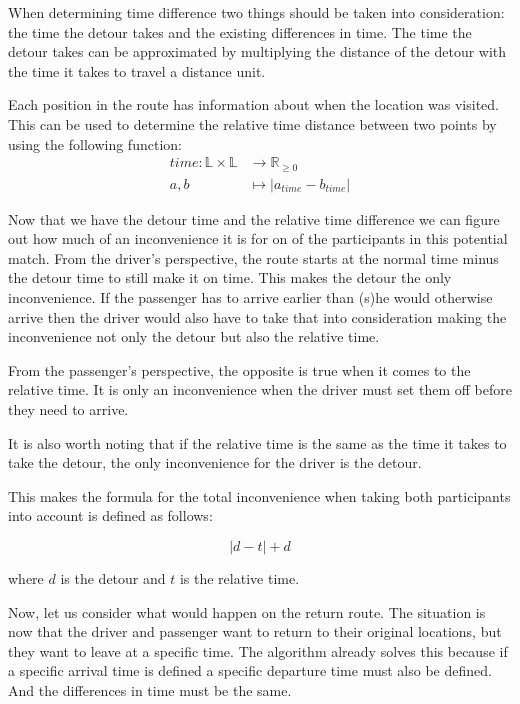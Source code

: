 When determining time difference two things should be taken into consideration: the time the detour takes and the existing differences in time.
The time the detour takes can be approximated by multiplying the distance of the detour with the time it takes to travel a distance unit.

Each position in the route has information about when the location was visited.
This can be used to determine the relative time distance between two points by using the following function:
\begin{align*}
	time : \mathbb{L}\times\mathbb{L} &\rightarrow \mathbb{R}_{\geq 0}\\
	a, b &\mapsto | a_{time} - b_{time} |
\end{align*}

Now that we have the detour time and the relative time difference we can figure out how much of an inconvenience it is for on of the participants in this potential match.
From the driver's perspective, the route starts at the normal time minus the detour time to still make it on time.
This makes the detour the only inconvenience.
If the passenger has to arrive earlier than (s)he would otherwise arrive then the driver would also have to take that into consideration making the inconvenience not only the detour but also the relative time.

From the passenger's perspective, the opposite is true when it comes to the relative time. 
It is only an inconvenience when the driver must set them off before they need to arrive.

It is also worth noting that if the relative time is the same as the time it takes to take the detour, the only inconvenience for the driver is the detour.

This makes the formula for the total inconvenience when taking both participants into account is defined as follows:

\[ |d - t| + d \]

where $d$ is the detour and $t$ is the relative time.

Now, let us consider what would happen on the return route.
The situation is now that the driver and passenger want to return to their original locations, but they want to leave at a specific time.
The algorithm already solves this because if a specific arrival time is defined a specific departure time must also be defined.
And the differences in time must be the same.

